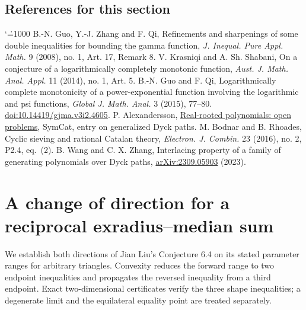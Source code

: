 \documentclass[11pt,a4paper]{article}
\makeatletter
\numberwithin{equation}{section}
\theoremstyle{definition}
\theoremstyle{remark}
\newenvironment{sectionabstract}{\par\smallskip\begingroup\small\noindent}{\par\endgroup\medskip}
\renewenvironment{thebibliography}[1]
 {\subsection*{References for this section}\small
  \list{\@biblabel{\@arabic\c@enumiv}}
       {\settowidth\labelwidth{\@biblabel{#1}}\leftmargin\labelwidth
        \advance\leftmargin\labelsep\@openbib@code
        \usecounter{enumiv}\let\p@enumiv\@empty
        \renewcommand\theenumiv{\@arabic\c@enumiv}}
  \sloppy\clubpenalty4000\widowpenalty4000\sfcode`\.=1000\relax}
 {\def\@noitemerr{\@latex@warning{Empty bibliography}}\endlist}
\makeatother
\begin{document}
\begin{thebibliography}{9}\small
{} B.-N. Guo, Y.-J. Zhang and F. Qi, Refinements and sharpenings of some double inequalities for bounding the gamma function, \emph{J. Inequal. Pure Appl. Math.} 9 (2008), no. 1, Art. 17, Remark 8.
 V. Krasniqi and A. Sh. Shabani, On a conjecture of a logarithmically completely monotonic function, \emph{Aust. J. Math. Anal. Appl.} 11 (2014), no. 1, Art. 5.
 B.-N. Guo and F. Qi, Logarithmically complete monotonicity of a power-exponential function involving the logarithmic and psi functions, \emph{Global J. Math. Anal.} 3 (2015), 77--80. \href{https://doi.org/10.14419/gjma.v3i2.4605}{doi:10.14419/gjma.v3i2.4605}.
 P. Alexandersson, \href{https://www.symmetricfunctions.com/realRootedOpenProblems.htm}{Real-rooted polynomials: open problems}, SymCat, entry on generalized Dyck paths.
 M. Bodnar and B. Rhoades, Cyclic sieving and rational Catalan theory, \emph{Electron. J. Combin.} 23 (2016), no. 2, P2.4, eq.~(2).
 B. Wang and C. X. Zhang, Interlacing property of a family of generating polynomials over Dyck paths, \href{https://arxiv.org/abs/2309.05903}{arXiv:2309.05903} (2023).
\end{thebibliography}

\par\endgroup

\begingroup
\newcommand{\cyc}{\sum_{\rm cyc}}
\section{\texorpdfstring{A change of direction for a reciprocal exradius--median sum}{A change of direction for a reciprocal exradius--median sum}}\label{section:r40keio}
\par\medskip


\begin{sectionabstract}
We establish both directions of Jian Liu's Conjecture 6.4 on its stated parameter ranges for arbitrary triangles. Convexity reduces the forward range to two endpoint inequalities and propagates the reversed inequality from a third endpoint. Exact two-dimensional certificates verify the three shape inequalities; a degenerate limit and the equilateral equality point are treated separately.
\end{sectionabstract}
\end{document}
